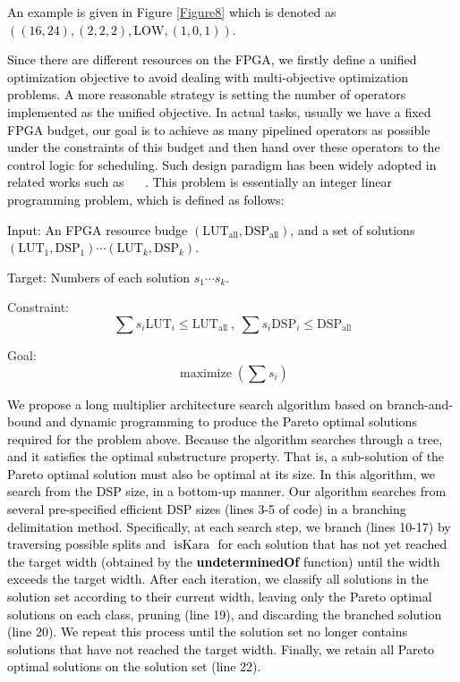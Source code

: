 \documentclass[conference]{IEEEtran}
\begin{document}
\textcolor{black}{
An example is given in Figure \ref{Figure8} which is denoted as $((16,24), (2,2,2), \text{LOW}, (1,0,1))$.
}


\textcolor{black}{
Since there are different resources on the FPGA, we firstly define a unified optimization objective to avoid dealing with multi-objective optimization problems. A more reasonable strategy is setting the number of operators implemented as the unified objective. In actual tasks, usually we have a fixed FPGA budget, our goal is to achieve as many pipelined operators as possible under the constraints of this budget and then hand over these operators to the control logic for scheduling. Such design paradigm has been widely adopted in related works such as ~\cite{PipeMSM} 
~\cite{FPGA_Acceleration_of_Multi_Scalar_Multiplication_CycloneMSM}. This problem is essentially an integer linear programming problem, which is defined as follows:
}


\textcolor{black}{
Input: An FPGA resource budge $(\text{LUT}_{\text{all}}, \text{DSP}_{\text{all}}) $, and a set of solutions $(\text{LUT}_1, \text{DSP}_1) \cdots (\text{LUT}_k, \text{DSP}_k) $.
}

\textcolor{black}{
Target: Numbers of each solution $s_1 \cdots s_k$.
}


Constraint:
\begin{equation}
    \sum s_i \text{LUT}_i \le \text{LUT}_{\text{all}} \ , \ \sum s_i \text{DSP}_i \le \text{DSP}_{\text{all}} 
\end{equation}


Goal:
\begin{equation}
    \operatorname{maximize}(\sum s_i )
\end{equation}


\textcolor{black}{
We propose a long multiplier architecture search algorithm based on branch-and-bound and dynamic programming to produce the Pareto optimal solutions required for the problem above. Because the algorithm searches through a tree, and it satisfies the optimal substructure property. That is, a sub-solution of the Pareto optimal solution must also be optimal at its size. In this algorithm, we search from the DSP size, in a bottom-up manner. Our algorithm searches from several pre-specified efficient DSP sizes (lines 3-5 of code) in a branching delimitation method. Specifically, at each search step, we branch (lines 10-17) by traversing possible splits and $\text{ isKara }$ for each solution that has not yet reached the target width (obtained by the \textbf {undeterminedOf }function) until the width exceeds the target width. After each iteration, we classify all solutions in the solution set according to their current width, leaving only the Pareto optimal solutions on each class, pruning (line 19), and discarding the branched solution (line 20). We repeat this process until the solution set no longer contains solutions that have not reached the target width. Finally, we retain all Pareto optimal solutions on the solution set (line 22).
}
\end{document}
